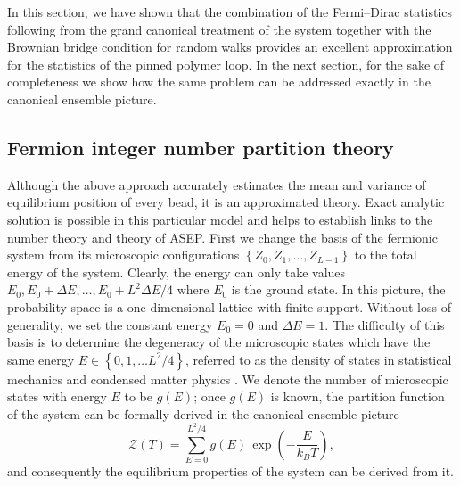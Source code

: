 \documentclass[aps,showpacs,twocolumn,floatfix,prx,superscriptaddress]{revtex4-1}
\begin{document}
In this section, we have shown that the combination of the Fermi--Dirac statistics following from the grand canonical treatment of the system together with the Brownian bridge condition for random walks provides an excellent approximation for the statistics of the pinned polymer loop. In the next section, for the sake of completeness we show how the same problem can be addressed exactly in the canonical ensemble picture.

\subsection{Fermion integer number partition theory}
\label{sec:numberPartition}

Although the above approach accurately estimates the mean and variance of equilibrium position of every bead, it is an approximated theory. Exact analytic solution is possible in this particular model and helps to establish links to the number theory and theory of ASEP. First we change the basis of the fermionic system from its microscopic configurations $\left\{Z_0,Z_1,\ldots,Z_{L-1}\right\}$ to the total energy of the system. Clearly, the energy can only take values $E_0, E_0+\Delta E, \ldots, E_0 + L^2 \Delta E / 4$ where $E_0$ is the ground state. In this picture, the probability space is a one-dimensional lattice with finite support. Without loss of generality, we set the constant energy $E_0=0$ and $\Delta E=1$. The difficulty of this basis is to determine the degeneracy of the microscopic states which have the same energy $E \in \left\{0,1,\ldots L^2/4\right\}$, referred to as the density of states in statistical mechanics \cite{huang1987statistical} and condensed matter physics \cite{sander2009advanced}. We denote the number of microscopic states with energy $E$ to be $g(E)$; once $g(E)$ is known, the partition function of the system can be formally derived in the canonical ensemble picture
\begin{equation}
\mathcal{Z}\left(T\right) = \sum_{E=0}^{L^2/4} g(E) \, \exp \left(-\frac{E}{k_B T}\right),
\label{eq:par_func}
\end{equation}
and consequently the equilibrium properties of the system can be derived from it. 
\end{document}
